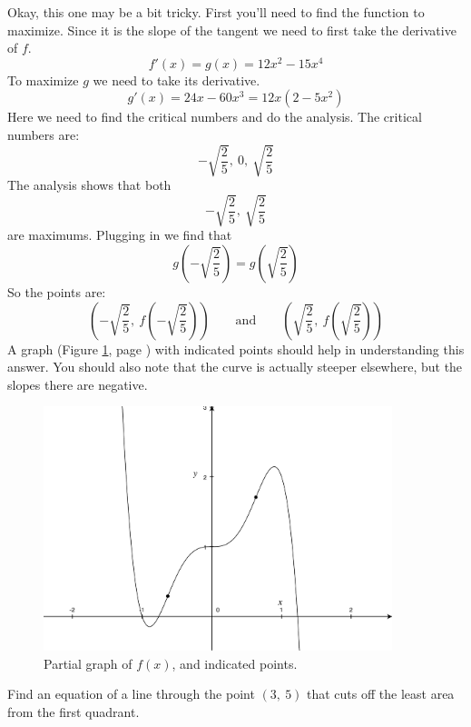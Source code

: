 \documentclass[12pt,addpoints, answers, fleqn]{exam}
\begin{document}
\begin{questions}
\begin{solution}
Okay, this one may be a bit tricky. First you'll need to find the function to maximize. Since it is the slope of the tangent we need to first take the derivative of $f$.
\[
f'\left( x \right) = g \left( x \right) = 12x^2 - 15x^4
\]
To maximize $g$ we need to take its derivative.
\[
g' \left( x \right) = 24x - 60x^3 = 12 x \left( 2 - 5 x^2 \right)
\]
Here we need to find the critical numbers and do the analysis. The critical numbers are:
\[
- \sqrt{\frac{2}{5}}, \ 0, \ \sqrt{\frac{2}{5}}
\]
The analysis shows that both
\[
- \sqrt{\frac{2}{5}}, \ \sqrt{\frac{2}{5}}
\]
are maximums. Plugging in we find that
\[
g \left( - \sqrt{\frac{2}{5}}\right) = g \left(  \sqrt{\frac{2}{5}}\right) 
\]
So the points are:
\[
\left( - \sqrt{\frac{2}{5}}, \  f \left( - \sqrt{\frac{2}{5}}\right) \right) \qquad \mbox{and} \qquad \left(  \sqrt{\frac{2}{5}}, \  f \left(  \sqrt{\frac{2}{5}} \right) \right)
\]
A graph (Figure \ref{fig:graph2404}, page \pageref{fig:graph2404}) with indicated points  should help in understanding this answer. You should also note that the curve is actually steeper elsewhere, but the slopes there are negative.
\end{solution}
\begin{figure}[htbp] %
   \centering
   \includegraphics[width=4in]{./graphics/graph2404.pdf} 
   \caption{Partial graph of $f\left( x \right)$, and indicated points.}
   \label{fig:graph2404}
\end{figure}


\question Find an equation of a line through the point $\left( 3, \ 5 \right)$ that cuts off the least area from the first quadrant.


\end{questions}
\end{document}
